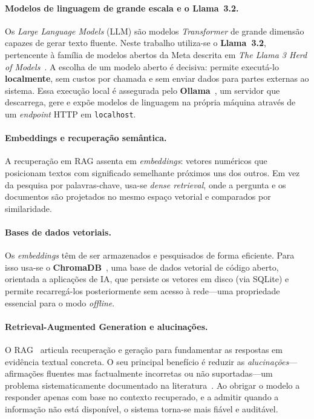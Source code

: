\documentclass[]{ceurart}
\begin{document}
\paragraph{Modelos de linguagem de grande escala e o Llama~3.2.}
Os \emph{Large Language Models} (LLM) são modelos \emph{Transformer} de grande
dimensão capazes de gerar texto fluente. Neste trabalho utiliza-se o
\textbf{Llama~3.2}, pertencente à família de modelos abertos da Meta descrita
em \emph{The Llama 3 Herd of Models}~\cite{llama3}. A escolha de um modelo aberto
é decisiva: permite executá-lo \textbf{localmente}, sem custos por chamada e sem
enviar dados para partes externas ao sistema. Essa execução local é assegurada pelo
\textbf{Ollama}~\cite{ollama}, um servidor que descarrega, gere e expõe modelos
de linguagem na própria máquina através de um \emph{endpoint} HTTP em
\texttt{localhost}.

\paragraph{Embeddings e recuperação semântica.}
A recuperação em RAG assenta em \emph{embeddings}: vetores numéricos que
posicionam textos com significado semelhante próximos uns dos outros. Em vez da
pesquisa por palavras-chave, usa-se \emph{dense retrieval}, onde a pergunta e os
documentos são projetados no mesmo espaço vetorial e comparados por similaridade.

\paragraph{Bases de dados vetoriais.}
Os \emph{embeddings} têm de ser armazenados e pesquisados de forma eficiente.
Para isso usa-se o \textbf{ChromaDB}~\cite{chromadb}, uma base de dados vetorial
de código aberto, orientada a aplicações de IA, que persiste os vetores em disco
(via SQLite) e permite recarregá-los posteriormente sem acesso à rede---uma
propriedade essencial para o modo \emph{offline}.

\paragraph{Retrieval-Augmented Generation e alucinações.}
O RAG~\cite{gao2024rag} articula recuperação e geração para fundamentar as
respostas em evidência textual concreta. O seu principal benefício é reduzir as
\emph{alucinações}---afirmações fluentes mas factualmente incorretas ou não
suportadas---um problema sistematicamente documentado na
literatura~\cite{ji2023hallucination}. Ao obrigar o modelo a responder apenas com
base no contexto recuperado, e a admitir quando a informação não está disponível,
o sistema torna-se mais fiável e auditável.
\end{document}
